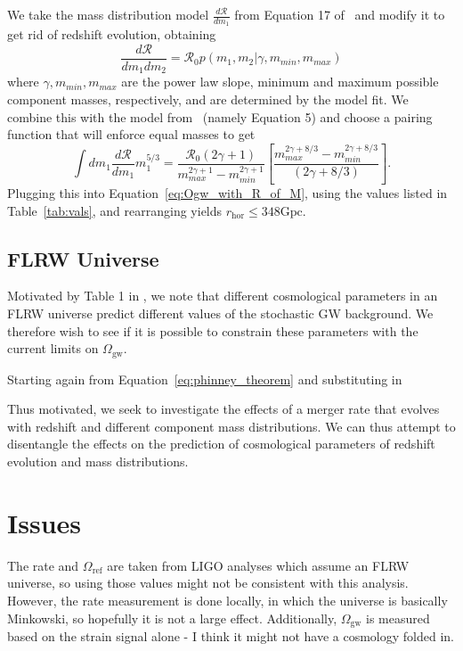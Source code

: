 \documentclass[]{article}
\newcommand{\Ogw}{\Omega_{\mathrm{gw}}}
\newcommand{\rhor}{r_{\text{hor}}}
\begin{document}
We take the mass distribution model $\frac{d\mathcal{R}}{dm_1}$ from Equation 17 of~\cite{O2_rates} and modify it to get rid of redshift evolution, obtaining
\begin{equation*}
\frac{d\mathcal{R}}{dm_1 dm_2} = \mathcal{R}_0 p(m_1, m_2 | \gamma, m_{min},m_{max})
\end{equation*}
where $\gamma, m_{min}, m_{max}$ are the power law slope, minimum and maximum possible component masses, respectively, and are determined by the model fit.
We combine this with the model from~\cite{picky_partners} (namely Equation 5) and choose a pairing function that will enforce equal masses to get
\begin{equation*}
\int d m_1 \frac{d\mathcal{R}}{dm_1} m_1 ^{5/3} = \frac{\mathcal{R}_0 (2\gamma +1)}{m_{max}^{2\gamma +1} - m_{min}^{2\gamma +1}} [\frac{m_{max}^{2\gamma +8/3} - m_{min}^{2\gamma +8/3}}{(2\gamma +8/3)}] . 
\end{equation*}
Plugging this into Equation~\ref{eq:Ogw_with_R_of_M}, using the values listed in Table~\ref{tab:vals}, and rearranging yields $\boxed{\rhor \leq 348 \mathrm{Gpc}}$. 

\subsection{FLRW Universe}
Motivated by Table 1 in \cite{Wesson_classical_olbers}, we note that different cosmological parameters in an FLRW universe predict different values of the stochastic GW background. 
We therefore wish to see if it is possible to constrain these parameters with the current limits on $\Ogw$. 

Starting again from Equation~\ref{eq:phinney_theorem} and substituting in 


Thus motivated, we seek to investigate the effects of a merger rate that evolves with redshift and different component mass distributions.
We can thus attempt to disentangle the effects on the prediction of cosmological parameters of redshift evolution and mass distributions.

\section{Issues}
The rate and $\Omega_{\text{ref}}$ are taken from LIGO analyses which assume an FLRW universe, so using those values might not be consistent with this analysis. 
However, the rate measurement is done locally, in which the universe is basically Minkowski, so hopefully it is not a large effect. 
Additionally, $\Ogw$ is measured based on the strain signal alone - I think it might not have a cosmology folded in.\\
\end{document}
